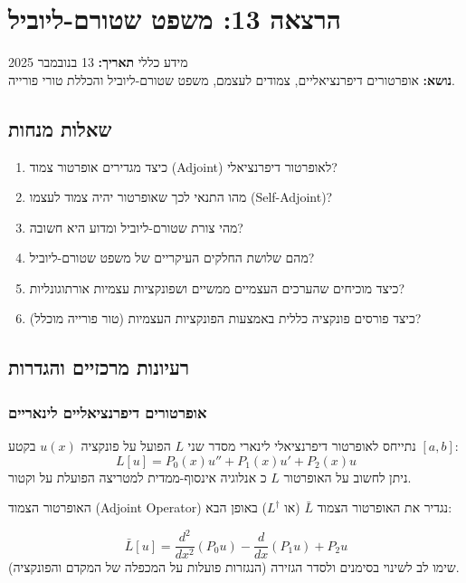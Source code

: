 \section{הרצאה 13: משפט שטורם-ליוביל}
\date{13.11.2025}
\label{sec:lecture13}
\begin{mainbox}
    {מידע כללי} \textbf{תאריך:} 13 בנובמבר 2025\\
    \textbf{נושא:} אופרטורים דיפרנציאליים, צמודים לעצמם, משפט שטורם-ליוביל והכללת
    טורי פורייה.
\end{mainbox}
\subsection*{שאלות מנחות}
\begin{enumerate}[label=\textbf{\arabic{*}.}, rightmargin=2em, leftmargin=1em]
    \item כיצד מגדירים אופרטור צמוד (Adjoint) לאופרטור דיפרנציאלי?

    \item מהו התנאי לכך שאופרטור יהיה צמוד לעצמו (Self-Adjoint)?

    \item מהי צורת שטורם-ליוביל ומדוע היא חשובה?

    \item מהם שלושת החלקים העיקריים של משפט שטורם-ליוביל?

    \item כיצד מוכיחים שהערכים העצמיים ממשיים ושפונקציות עצמיות אורתוגונליות?

    \item כיצד פורסים פונקציה כללית באמצעות הפונקציות העצמיות (טור פורייה מוכלל)?
\end{enumerate}
\subsection*{רעיונות מרכזיים והגדרות}
\subsubsection*{אופרטורים דיפרנציאליים לינאריים}
נתייחס לאופרטור דיפרנציאלי לינארי מסדר שני $L$ הפועל על פונקציה $u(x)$ בקטע
$[a,b]$:
\[
    L[u] = P_{0}(x) u'' + P_{1}(x) u' + P_{2}(x) u \]ניתן לחשוב על האופרטור $L$ כ
    אנלוגיה אינסוף-ממדית למטריצה הפועלת על וקטור.
    \begin{definitionbox}
        {האופרטור הצמוד (Adjoint Operator)} נגדיר את האופרטור הצמוד $\bar{L}$ (או
        $L^{\dagger}$) באופן הבא:

        \[
            \bar{L}[u] = \frac{d^{2}}{dx^{2}}(P_{0} u) - \frac{d}{dx}(P_{1} u) +
            P_{2} u
        \]שימו לב לשינוי בסימנים ולסדר הגזירה (הנגזרות פועלות על המכפלה של המקדם
        והפונקציה).
    \end{definitionbox}
